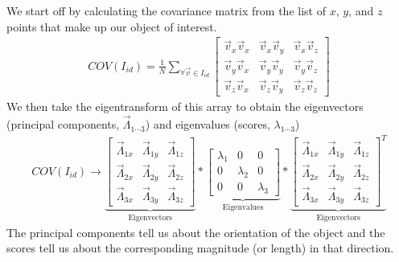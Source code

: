 \documentclass[letterpaper,10pt,english]{sphinxmanual}
\begin{document}
\sphinxAtStartPar
We start off by calculating the covariance matrix from the list of \(x\), \(y\), and \(z\) points that make up our object of interest.
\begin{equation*}
\begin{split} COV(I_{id}) = \frac{1}{N} \sum_{\forall\vec{v}\in I_{id}} \begin{bmatrix}
\vec{v}_x\vec{v}_x & \vec{v}_x\vec{v}_y & \vec{v}_x\vec{v}_z\\
\vec{v}_y\vec{v}_x & \vec{v}_y\vec{v}_y & \vec{v}_y\vec{v}_z\\
\vec{v}_z\vec{v}_x & \vec{v}_z\vec{v}_y & \vec{v}_z\vec{v}_z
\end{bmatrix} \end{split}
\end{equation*}
\sphinxAtStartPar
We then take the eigentransform of this array to obtain the eigenvectors (principal components, \(\vec{\Lambda}_{1\cdots 3}\)) and eigenvalues (scores, \(\lambda_{1\cdots 3}\))
\begin{equation*}
\begin{split} COV(I_{id}) \longrightarrow \underbrace{\begin{bmatrix}
\vec{\Lambda}_{1x} & \vec{\Lambda}_{1y} & \vec{\Lambda}_{1z} \\
\vec{\Lambda}_{2x} & \vec{\Lambda}_{2y} & \vec{\Lambda}_{2z} \\
\vec{\Lambda}_{3x} & \vec{\Lambda}_{3y} & \vec{\Lambda}_{3z} 
\end{bmatrix}}_{\textrm{Eigenvectors}} * \underbrace{\begin{bmatrix} 
\lambda_1 & 0 & 0 \\ 
0 & \lambda_2 & 0 \\
0 & 0 & \lambda_3
\end{bmatrix}}_{\textrm{Eigenvalues}} * \underbrace{\begin{bmatrix}
\vec{\Lambda}_{1x} & \vec{\Lambda}_{1y} & \vec{\Lambda}_{1z} \\
\vec{\Lambda}_{2x} & \vec{\Lambda}_{2y} & \vec{\Lambda}_{2z} \\
\vec{\Lambda}_{3x} & \vec{\Lambda}_{3y} & \vec{\Lambda}_{3z} 
\end{bmatrix}^{T}}_{\textrm{Eigenvectors}} \end{split}
\end{equation*}
\sphinxAtStartPar
The principal components tell us about the orientation of the object and the scores tell us about the corresponding magnitude (or length) in that direction.
\end{document}
